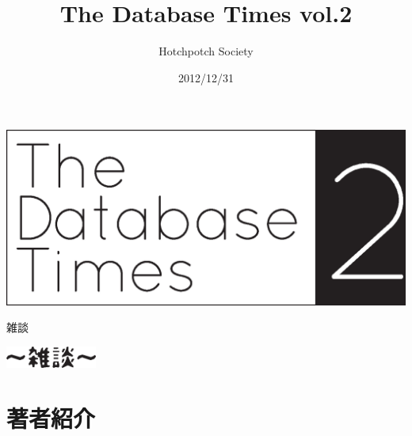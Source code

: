 \documentclass[b5paper,papersize,tombow,10pt]{jsbook}
\title{The Database Times vol.2}
\date{2012/12/31}
\author{Hotchpotch Society}
\begin{document}
\thispagestyle{empty}

\frontmatter

\vspace*{50mm}
\noindent\includegraphics[width=\textwidth]{images/title2.eps}



\setcounter{tocdepth}{0} %
\tableofcontents

\mainmatter

\pagestyle{fancy}









\newpage

{\protect 雑談}

\begin{center}
 \includegraphics[width=3cm]{images/zatsudan.eps}
\end{center}

\footnotesize



\normalsize

\newpage

\plainifnotempty

\section*{著者紹介}
\end{document}
